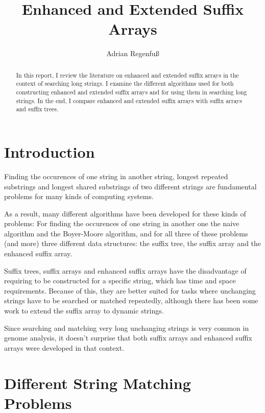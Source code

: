 \documentclass{article}
\title{Enhanced and Extended Suffix Arrays}
\author{Adrian Regenfuß}
\begin{document}
\maketitle

\begin{abstract}
In this report, I review the literature on enhanced and extended suffix arrays
in the context of searching long strings. I examine the different algorithms
used for both constructing enhanced and extended suffix arrays and for using
them in searching long strings.
In the end, I compare enhanced and extended suffix arrays with suffix arrays
and suffix trees.
\end{abstract}

\section*{Introduction}

Finding the occurences of one string in another string, longest repeated
substrings and longest shared substrings of two different strings are
fundamental problems for many kinds of computing systems.

As a result, many different algorithms have been developed for these
kinds of problems: For finding the occurences of one string in another one
the naive algorithm and the Boyer-Moore algorithm, %
and for all three of these problems (and more) three different data structures:
the suffix tree, %
the suffix array and the enhanced suffix array. %

Suffix trees, suffix arrays and enhanced suffix arrays have the
disadvantage of requiring to be constructed for a specific string,
which has time and space requirements.
Because of this, they are better suited for tasks where unchanging %
strings have to
be searched or matched repeatedly, although there has been some work to
extend the suffix array to dynamic strings. %

Since searching and matching very long unchanging strings is very common
in genome analysis, it doesn't surprise that both suffix arrays and
enhanced suffix arrays were developed in that context.

\section*{Different String Matching Problems}
\end{document}

